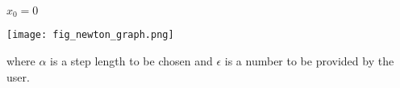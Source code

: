 \documentclass{article}
\begin{document}
\begin{minipage}[c]{.4\textwidth}
\begin{algorithm}[H]
    $x_0 = 0$ \\
\end{algorithm}
\end{minipage}%
\begin{minipage}[c]{.6\textwidth}
    \centering
    \texttt{[image: fig\_newton\_graph.png]}
     \label{fig:newton_graph}
\end{minipage}


where $\alpha$ is a step length to be chosen and $\epsilon$ is a number to be provided by the user.
\end{document}
